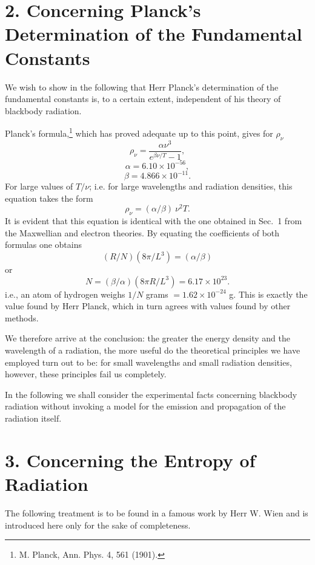 \documentclass[12pt]{article}
\begin{document}
\vspace{0.5cm}
\section*{
{\bf 2. Concerning Planck's Determination of the Fundamental Constants}}
\vspace{0.5cm}

We wish to show in the following that Herr Planck's determination of the
fundamental constants is, to a certain extent, independent of his theory of
blackbody radiation.

Planck's formula,\footnote{M. Planck, Ann. Phys. 4, 561 (1901).} which has
proved adequate up to this point, gives for $\rho_{\nu}$
$$
\rho_{\nu} = \frac{\alpha \nu^3}{e^{\beta \nu /T} - 1},
$$
$$
\alpha = 6.10 \times 10^{-56},
$$
$$
\beta = 4.866 \times 10^{-11}.
$$
For large values of $T/\nu$; i.e. for large wavelengths and radiation
densities, this equation takes the form
$$
\rho_{\nu} = (\alpha/\beta) ~\nu^2  T.
$$
It is evident that this equation is identical with the one obtained in Sec.~1
from the Maxwellian and electron theories. By equating the coefficients of both
formulas one obtains 
$$
(R/N)  (8 \pi/L^3) = (\alpha/\beta)
$$
or
$$
N = (\beta/\alpha)  (8 \pi R/L^3) = 6.17 \times 10^{23}.
$$
i.e., an atom of hydrogen weighs $1/N$ grams $= 1.62 \times 10^{-24}$ g. This is
exactly the value found by Herr Planck, which in turn agrees with values found
by other methods. 

We therefore arrive at the conclusion: the greater the energy density and the
wavelength of a radiation, the more useful do the theoretical principles we have
employed turn out to be: for small wavelengths and small radiation densities,
however, these principles fail us completely.

In the following we shall consider the experimental facts concerning blackbody
radiation without invoking a model for the emission and propagation of the
radiation itself.  

\vspace{0.5cm}
\section*{
{\bf 3. Concerning the Entropy of Radiation}}
\vspace{0.5cm}

The following treatment is to be found in a famous work by Herr W. Wien and is
introduced here only for the sake of completeness.
\end{document}
